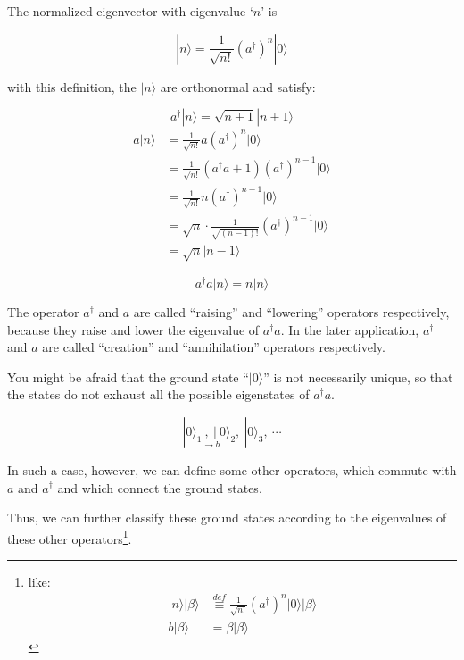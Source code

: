 The normalized eigenvector with eigenvalue `$n$' is

\begin{equation}
|n\rangle = \frac{1}{\sqrt{n!}}(a^{\dagger})^n|0\rangle
\end{equation}

with this definition, the $|n\rangle$ are orthonormal and satisfy:

\begin{equation}\label{1.1.2}
a^{\dagger}|n\rangle = \sqrt{n+1}|n+1\rangle
\end{equation}
\begin{equation}\label{1.1.3}
\begin{split}
a|n\rangle &= \frac{1}{\sqrt{n!}}a(a^{\dagger})^n|0\rangle\\
&=\frac{1}{\sqrt{n!}}(a^{\dagger}a+1)(a^{\dagger})^{n-1}|0\rangle\\
&=\frac{1}{\sqrt{n!}}n(a^{\dagger})^{n-1}|0\rangle\\
&=\sqrt{n}\cdot\frac{1}{\sqrt{(n-1)!}}(a^{\dagger})^{n-1}|0\rangle\\
&=\sqrt{n}|n-1\rangle
\end{split}
\end{equation}

\[a^{\dagger}a|n\rangle = n|n\rangle \]

The operator $a^{\dagger}$ and $a$ are called ``raising'' and ``lowering'' operators respectively, because they raise and lower the eigenvalue of $a^{\dagger}a$.
In the later application, $a^{\dagger}$ and $a$ are called ``creation'' and ``annihilation'' operators respectively.

You might be afraid that the ground state ``$|0\rangle$'' is not necessarily unique, so that the states do not exhaust all the possible eigenstates of $a^{\dagger}a$.

\[|0\rangle_1\underset{\rightarrow b}{,\ |}0\rangle_2,\ |0\rangle_3,\ \cdots \]

In such a case, however, we can define some other operators, which commute with $a$ and $a^{\dagger}$ and which connect the ground states.

Thus, we can further classify these ground states according to the eigenvalues of these other operators\footnote{like:
\[\begin{split}|n\rangle|\beta\rangle &\overset{def}{\equiv}\frac{1}{\sqrt{n!}}(a^{\dagger})^n|0\rangle|\beta\rangle \\
b|\beta\rangle &= \beta|\beta\rangle
\end{split}\]}.



